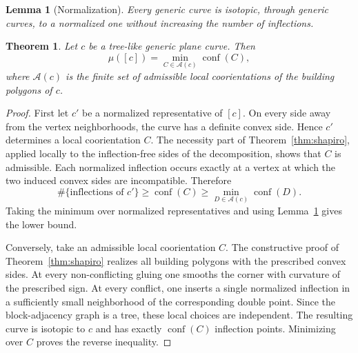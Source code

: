 \documentclass[10pt,a4paper]{amsart}
\newtheorem{theorem}{Theorem}
\newtheorem{lemma}{Lemma}
\newcommand{\A}{\mathcal A}
\newcommand{\conf}{\operatorname{conf}}
\begin{document}
\begin{lemma}[Normalization]\label{lem:normalization}
Every generic curve is isotopic, through generic curves, to a normalized one without increasing the number of inflections.
\end{lemma}

\begin{theorem}\label{thm:formula}
Let $c$ be a tree-like generic plane curve.  Then
\[
 \mu([c])=
 \min_{C\in\A(c)} \conf(C),
\]
where $\A(c)$ is the finite set of admissible local coorientations of the building polygons of $c$.
\end{theorem}

\begin{proof}
First let $c'$ be a normalized representative of $[c]$.  On every side away from the vertex neighborhoods, the curve has a definite convex side.  Hence $c'$ determines a local coorientation $C$.  The necessity part of Theorem~\ref{thm:shapiro}, applied locally to the inflection-free sides of the decomposition, shows that $C$ is admissible.  Each normalized inflection occurs exactly at a vertex at which the two induced convex sides are incompatible.  Therefore
\[
 \#\{\text{inflections of }c'\}\ge \conf(C)\ge
 \min_{D\in\A(c)}\conf(D).
\]
Taking the minimum over normalized representatives and using Lemma~\ref{lem:normalization} gives the lower bound.

Conversely, take an admissible local coorientation $C$.  The constructive proof of Theorem~\ref{thm:shapiro} realizes all building polygons with the prescribed convex sides.  At every non-conflicting gluing one smooths the corner with curvature of the prescribed sign.  At every conflict, one inserts a single normalized inflection in a sufficiently small neighborhood of the corresponding double point.  Since the block-adjacency graph is a tree, these local choices are independent.  The resulting curve is isotopic to $c$ and has exactly $\conf(C)$ inflection points.  Minimizing over $C$ proves the reverse inequality.
\end{proof}
\end{document}
